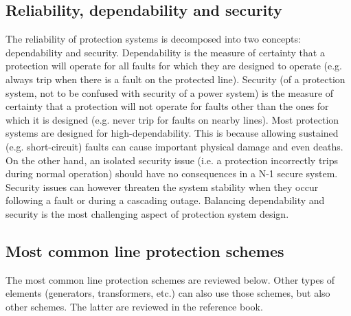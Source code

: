 \subsection{Reliability, dependability and security}

The reliability of protection systems is decomposed into two concepts: dependability and security. Dependability is the measure of certainty that a protection will operate for all faults for which they are designed to operate (e.g. always trip when there is a fault on the protected line). Security (of a protection system, not to be confused with security of a power system) is the measure of certainty that a protection will not operate for faults other than the ones for which it is designed (e.g. never trip for faults on nearby lines). Most protection systems are designed for high-dependability. This is because allowing sustained (e.g. short-circuit) faults can cause important physical damage and even deaths. On the other hand, an isolated security issue (i.e. a protection incorrectly trips during normal operation) should have no consequences in a N-1 secure system. Security issues can however threaten the system stability when they occur following a fault or during a cascading outage. Balancing dependability and security is the most challenging aspect of protection system design.

\subsection{Most common line protection schemes}

The most common line protection schemes are reviewed below. Other types of elements (generators, transformers, etc.) can also use those schemes, but also other schemes. The latter are reviewed in the reference book.

